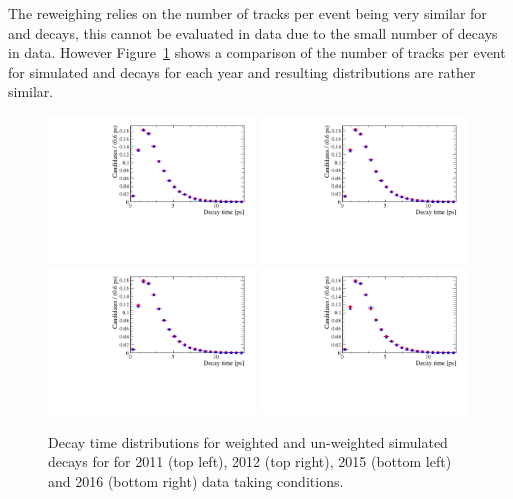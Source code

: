 The reweighing relies on the number of tracks per event being very similar for \bdkpi and \bsmumu decays, this cannot be evaluated in data due to the small number of \bsmumu decays in data. However Figure~\ref{fig:BsTomumu_weightDecayTime} shows a comparison of the number of tracks per event for simulated \bsmumu and \bdkpi decays for each year and resulting distributions are rather similar.
\begin{figure}[htbp]
  \centering
    \includegraphics[width=0.49\textwidth]{./Figs/LifetimeMeasurement/2011_DT_Bs2MuMu.pdf}
    \includegraphics[width=0.49\textwidth]{./Figs/LifetimeMeasurement/2012_DT_Bs2MuMu.pdf}
    \includegraphics[width=0.49\textwidth]{./Figs/LifetimeMeasurement/2015_DT_Bs2MuMu.pdf}
    \includegraphics[width=0.49\textwidth]{./Figs/LifetimeMeasurement/2016_DT_Bs2MuMu.pdf}
  \caption{Decay time distributions for weighted and un-weighted \bsmumu simulated decays for for 2011 (top left), 2012 (top right), 2015 (bottom left) and 2016 (bottom right) data taking conditions.}
  \label{fig:BsTomumu_weightDecayTime}
\end{figure}

